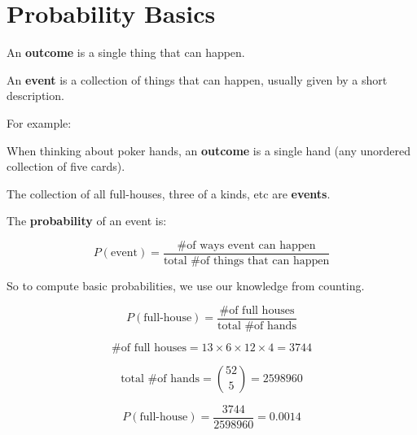 \section{Probability Basics}

%
\begin{frame}

An \textbf{outcome} is a single thing that can happen.

\hfill

An \textbf{event} is a collection of things that can happen, usually given by a
short description.

\end{frame}
%

%
\begin{frame}

For example:

\hfill

When thinking about poker hands, an \textbf{outcome} is a single hand (any
unordered collection of five cards).

\hfill

The collection of all full-houses, three of a kinds, etc are \textbf{events}.

\end{frame}


%
\begin{frame}

The \textbf{probability} of an event is:

$$ P(\text{event}) = \frac{\text{\# of ways event can happen}}{\text{total \# of
things that can happen}} $$

So to compute basic probabilities, we use our knowledge from counting.

\end{frame}
%

%
\begin{frame}

$$ P(\text{full-house}) = \frac{\text{\# of full houses}}{\text{total \# of
hands}} $$

\end{frame}
%

%
\begin{frame}

$$ \text{\# of full houses} = 13 \times 6 \times 12 \times 4 = 3744 $$

$$ \text{total \# of hands} = {{52}\choose{5}} = 2598960 $$

\end{frame}
%

%
\begin{frame}

$$ P(\text{full-house}) = \frac{3744}{2598960} = 0.0014 $$

\end{frame}
%

